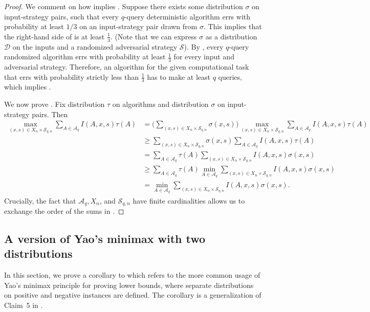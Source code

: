 \documentclass{toc}
\begin{document}
\begin{proof}
		We comment on how  implies . Suppose there exists some distribution $\sigma$ on input-strategy pairs, such that every $q$-query deterministic algorithm errs with probability at least $1/3$ on an input-strategy pair drawn from $\sigma$.
		This implies that the right-hand side of  is at least $\frac{1}{3}$. (Note that we can express $\sigma$ as a distribution $\mathcal{D}$ on the inputs and a randomized adversarial strategy $\mathcal{S}$).  By , every $q$-query randomized algorithm errs with probability at least $\frac{1}{3}$ for every input and adversarial strategy. Therefore, an algorithm for the given computational task that errs with probability strictly less than $\frac{1}{3}$ has to make at least $q$ queries, which implies . 

		
		We now prove . Fix  
  distribution $\tau$ on algorithms and distribution $\sigma$ on input-strategy pairs. Then
		\begin{align}
		\max_{(x, s) \in X_n \times \mathcal{S}_{q,n}} \sum_{A \in \mathcal{A}_q} I(A,x,s)\tau(A) &= \biggl(\sum_{(x, s) \in X_n \times \mathcal{S}_{q,n}}  \sigma(x,s) \biggr) \max_{(x, s) \in X_n \times \mathcal{S}_{q,n}}  \sum_{A \in \mathcal{A}_q} I(A,x,s)\tau(A) \nonumber \\ 
		&\geq \sum_{(x, s) \in X_n \times \mathcal{S}_{q,n}}\sigma(x,s) \sum_{A \in \mathcal{A}_q} I(A,x,s)\tau(A)  \nonumber \\ 
		&= \sum_{A \in \mathcal{A}_q} \tau(A) \sum_{(x, s) \in X_n \times \mathcal{S}_{q,n}} I(A,x,s)\sigma(x,s) \label{eq:exchange} \\ 
		&\geq \sum_{A \in \mathcal{A}_q} \tau(A) \min_{A \in \mathcal{A}_q}\sum_{(x, s) \in X_n \times \mathcal{S}_{q,n}} I(A,x,s)\sigma(x,s)\nonumber  \\ 
		&= \min_{A \in \mathcal{A}_q}\sum_{(x, s) \in X_n \times \mathcal{S}_{q,n}} I(A,x,s)\sigma(x,s). \nonumber
		\end{align}
		Crucially, the fact that $\mathcal{A}_q, X_n$, and  $\mathcal{S}_{q,n}$ have finite cardinalities
		allows us to exchange the order of the sums in .
	\end{proof}
	
%
\subsection{A version of Yao's minimax with two distributions}\label{sec:yao_2}
In this section, we prove a corollary to  which refers to the more common usage of Yao's minimax principle for proving lower bounds, where separate distributions on positive and negative instances are defined. The corollary is a generalization of  Claim~5 in \cite{RS06}. 
\end{document}
